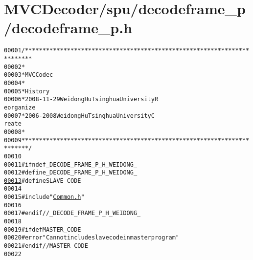 \hypertarget{decodeframe__p_8h_source}{
\section{MVCDecoder/spu/decodeframe\_\-p/decodeframe\_\-p.h}
}


\begin{footnotesize}\begin{alltt}
00001 \textcolor{comment}{/************************************************************************}
00002 \textcolor{comment}{ *}
00003 \textcolor{comment}{ * MVC Codec}
00004 \textcolor{comment}{ * }
00005 \textcolor{comment}{ * History}
00006 \textcolor{comment}{ * 2008-11-29           Weidong Hu              Tsinghua University             R
      eorganize}
00007 \textcolor{comment}{ * 2006-2008            Weidong Hu              Tsinghua University             C
      reate}
00008 \textcolor{comment}{ * }
00009 \textcolor{comment}{ ************************************************************************/}
00010 
00011 \textcolor{preprocessor}{#ifndef \_DECODE\_FRAME\_P\_H\_WEIDONG\_}
00012 \textcolor{preprocessor}{}\textcolor{preprocessor}{#define \_DECODE\_FRAME\_P\_H\_WEIDONG\_}
\hypertarget{decodeframe__p_8h_source_l00013}{}\hyperlink{decodeframe__p_8h_a995f6a4907273b8d56b6543ab1a57d17}{00013} \textcolor{preprocessor}{}\textcolor{preprocessor}{#define SLAVE\_CODE}
00014 \textcolor{preprocessor}{}
00015 \textcolor{preprocessor}{#include "\hyperlink{_common_8h}{Common.h}"}
00016 
00017 \textcolor{preprocessor}{#endif //\_DECODE\_FRAME\_P\_H\_WEIDONG\_}
00018 \textcolor{preprocessor}{}
00019 \textcolor{preprocessor}{#ifdef MASTER\_CODE}
00020 \textcolor{preprocessor}{}\textcolor{preprocessor}{#error "Can not include slave code in master program"}
00021 \textcolor{preprocessor}{}\textcolor{preprocessor}{#endif // MASTER\_CODE}
00022 \textcolor{preprocessor}{}
\end{alltt}\end{footnotesize}
